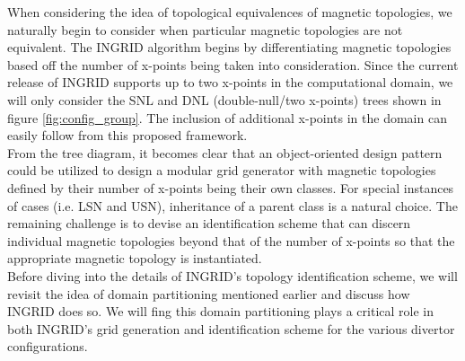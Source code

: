 \indent
When considering the idea of topological equivalences of magnetic topologies, we naturally begin to consider when particular magnetic topologies are not equivalent. The INGRID algorithm begins by differentiating magnetic topologies based off the number of x-points being taken into consideration. Since the current release of INGRID supports up to two x-points in the computational domain, we will only consider the SNL and DNL (double-null/two x-points) trees shown in figure \ref{fig:config_group}. The inclusion of additional x-points in the domain can easily follow from this proposed framework. \\ \indent
From the tree diagram, it becomes clear that an object-oriented design pattern could be utilized to design a modular grid generator with magnetic topologies defined by their number of x-points being their own classes. For special instances of cases (i.e. LSN and USN), inheritance of a parent class is a natural choice. The remaining challenge is to devise an identification scheme that can discern individual magnetic topologies beyond that of the number of x-points so that the appropriate magnetic topology is instantiated.\\
Before diving into the details of INGRID's topology identification scheme, we will revisit the idea of domain partitioning mentioned earlier and discuss how INGRID does so. We will fing this domain partitioning plays a critical role in both INGRID's grid generation and identification scheme for the various divertor configurations.
